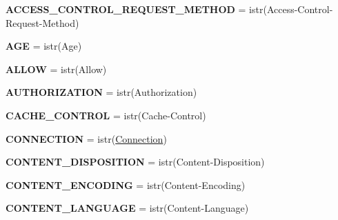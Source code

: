 \begin{DoxyCompactItemize}
{\bfseries A\+C\+C\+E\+S\+S\+\_\+\+C\+O\+N\+T\+R\+O\+L\+\_\+\+R\+E\+Q\+U\+E\+S\+T\+\_\+\+M\+E\+T\+H\+OD} = istr(\textquotesingle{}Access-\/Control-\/Request-\/Method\textquotesingle{})
\item 
\mbox{\label{namespaceaiohttp_1_1hdrs_ae659fe560cbaec8bddf79ec4d069e920}} 
{\bfseries A\+GE} = istr(\textquotesingle{}Age\textquotesingle{})
\item 
\mbox{\label{namespaceaiohttp_1_1hdrs_a5c23b055e0faa107085c1d8ea9bbe5c6}} 
{\bfseries A\+L\+L\+OW} = istr(\textquotesingle{}Allow\textquotesingle{})
\item 
\mbox{\label{namespaceaiohttp_1_1hdrs_a150777e3852c4ae58bd9f7fe5f49b802}} 
{\bfseries A\+U\+T\+H\+O\+R\+I\+Z\+A\+T\+I\+ON} = istr(\textquotesingle{}Authorization\textquotesingle{})
\item 
\mbox{\label{namespaceaiohttp_1_1hdrs_a6507e88a754257c7fdfa2a3327a18e45}} 
{\bfseries C\+A\+C\+H\+E\+\_\+\+C\+O\+N\+T\+R\+OL} = istr(\textquotesingle{}Cache-\/Control\textquotesingle{})
\item 
\mbox{\label{namespaceaiohttp_1_1hdrs_a0f0453f3505c49b9330b2f8beda8a249}} 
{\bfseries C\+O\+N\+N\+E\+C\+T\+I\+ON} = istr(\textquotesingle{}\hyperlink{classaiohttp_1_1connector_1_1_connection}{Connection}\textquotesingle{})
\item 
\mbox{\label{namespaceaiohttp_1_1hdrs_a71e94244beec87c2bc871ed41c0e751b}} 
{\bfseries C\+O\+N\+T\+E\+N\+T\+\_\+\+D\+I\+S\+P\+O\+S\+I\+T\+I\+ON} = istr(\textquotesingle{}Content-\/Disposition\textquotesingle{})
\item 
\mbox{\label{namespaceaiohttp_1_1hdrs_ad3d578ec2a83e53e62d7ff531baa34a8}} 
{\bfseries C\+O\+N\+T\+E\+N\+T\+\_\+\+E\+N\+C\+O\+D\+I\+NG} = istr(\textquotesingle{}Content-\/Encoding\textquotesingle{})
\item 
\mbox{\label{namespaceaiohttp_1_1hdrs_ab8a2814fdefdbacd5f01fcf20c703e56}} 
{\bfseries C\+O\+N\+T\+E\+N\+T\+\_\+\+L\+A\+N\+G\+U\+A\+GE} = istr(\textquotesingle{}Content-\/Language\textquotesingle{})

\end{DoxyCompactItemize}
